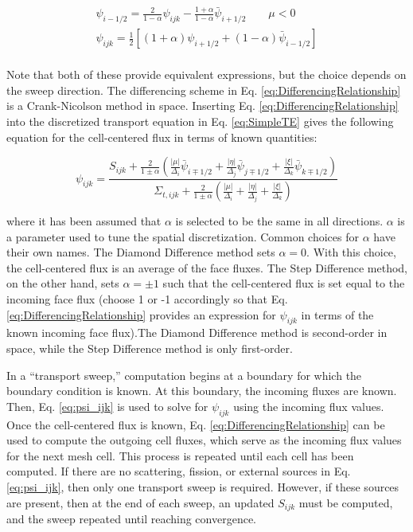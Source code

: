 \documentclass[10pt]{article}
\begin{document}
\begin{flushleft}
\begin{equation}
\begin{aligned}
\psi_{i-1/2}=\frac{2}{1-\alpha}\psi_{ijk}-\frac{1+\alpha}{1-\alpha}\bar{\psi}_{i+1/2}\quad\quad\mu <0\\
\psi_{ijk}=\frac{1}{2}\left\lbrack(1+\alpha)\psi_{i+1/2}+(1-\alpha)\bar{\psi}_{i-1/2}\right\rbrack\\
\end{aligned}
\end{equation}

Note that both of these provide equivalent expressions, but the choice depends on the sweep direction. The differencing scheme in Eq. \eqref{eq:DifferencingRelationship} is a Crank-Nicolson method in space. Inserting Eq. \eqref{eq:DifferencingRelationship} into the discretized transport equation in Eq. \eqref{eq:SimpleTE} gives the following equation for the cell-centered flux in terms of known quantities:

\begin{equation}
\label{eq:psi_ijk}
\psi_{ijk}=\frac{S_{ijk}+\frac{2}{1\pm\alpha}\left(\frac{|\mu|}{\Delta_i}\bar{\psi}_{i\mp1/2}+\frac{|\eta|}{\Delta_j}\bar{\psi}_{j\mp1/2}+\frac{|\xi|}{\Delta_k}\bar{\psi}_{k\mp1/2}\right)}{\Sigma_{t,ijk}+\frac{2}{1\pm\alpha}\left(\frac{|\mu|}{\Delta_i}+\frac{|\eta|}{\Delta_j}+\frac{|\xi|}{\Delta_k}\right)}
\end{equation}

where it has been assumed that \(\alpha\) is selected to be the same in all directions. \(\alpha\) is a parameter used to tune the spatial discretization. Common choices for \(\alpha\) have their own names. The Diamond Difference method sets \(\alpha=0\). With this choice, the cell-centered flux is an average of the face fluxes. The Step Difference method, on the other hand, sets \(\alpha=\pm1\) such that the cell-centered flux is set equal to the incoming face flux (choose 1 or -1 accordingly so that Eq. \eqref{eq:DifferencingRelationship} provides an expression for \(\psi_{ijk}\) in terms of the known incoming face flux).The Diamond Difference method is second-order in space, while the Step Difference method is only first-order. 

In a ``transport sweep,'' computation begins at a boundary for which the boundary condition is known. At this boundary, the incoming fluxes are known. Then, Eq. \eqref{eq:psi_ijk} is used to solve for \(\psi_{ijk}\) using the incoming flux values. Once the cell-centered flux is known, Eq. \eqref{eq:DifferencingRelationship} can be used to compute the outgoing cell fluxes, which serve as the incoming flux values for the next mesh cell. This process is repeated until each cell has been computed. If there are no scattering, fission, or external sources in Eq. \eqref{eq:psi_ijk}, then only one transport sweep is required. However, if these sources are present, then at the end of each sweep, an updated \(S_{ijk}\) must be computed, and the sweep repeated until reaching convergence. 


\end{flushleft}
\end{document}
